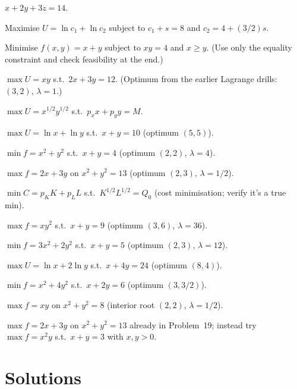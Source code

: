 \begin{problems}
        $x + 2 y + 3 z = 14$.
  \item Maximise $U = \ln c_1 + \ln c_2$ subject to $c_1 + s = 8$ and
        $c_2 = 4 + (3/2) s$.
  \item Minimise $f(x, y) = x + y$ subject to $x y = 4$ and $x \geq y$.
        (Use only the equality constraint and check feasibility at the
        end.)
  \item $\max U = x y$ s.t.\ $2 x + 3 y = 12$. (Optimum from the earlier
        Lagrange drills: $(3, 2)$, $\lambda = 1$.)
  \item $\max U = x^{1/2} y^{1/2}$ s.t.\ $p_x x + p_y y = M$.
  \item $\max U = \ln x + \ln y$ s.t.\ $x + y = 10$ (optimum $(5, 5)$).
  \item $\min f = x^2 + y^2$ s.t.\ $x + y = 4$ (optimum $(2, 2)$,
        $\lambda = 4$).
  \item $\max f = 2 x + 3 y$ on $x^2 + y^2 = 13$ (optimum $(2, 3)$,
        $\lambda = 1/2$).
  \item $\min C = p_K K + p_L L$ s.t.\ $K^{1/2} L^{1/2} = Q_0$ (cost
        minimisation; verify it's a true min).
  \item $\max f = x y^2$ s.t.\ $x + y = 9$ (optimum $(3, 6)$,
        $\lambda = 36$).
  \item $\min f = 3 x^2 + 2 y^2$ s.t.\ $x + y = 5$ (optimum $(2, 3)$,
        $\lambda = 12$).
  \item $\max U = \ln x + 2 \ln y$ s.t.\ $x + 4 y = 24$ (optimum
        $(8, 4)$).
  \item $\min f = x^2 + 4 y^2$ s.t.\ $x + 2 y = 6$ (optimum $(3, 3/2)$).
  \item $\max f = x y$ on $x^2 + y^2 = 8$ (interior root $(2, 2)$,
        $\lambda = 1/2$).
  \item $\max f = 2 x + 3 y$ on $x^2 + y^2 = 13$ already in
        Problem~19; instead try $\max f = x^2 y$ s.t.\ $x + y = 3$ with
        $x, y > 0$.
\end{problems}

\section{Solutions}

